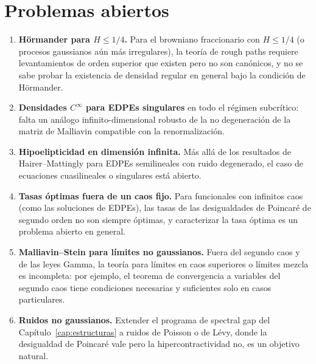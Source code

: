 \section{Problemas abiertos}
\begin{enumerate}
  \item \textbf{Hörmander para $H\le1/4$.} Para el browniano fraccionario con $H\le1/4$ (o procesos
  gaussianos aún más irregulares), la teoría de rough paths requiere levantamientos de orden
  superior que existen pero no son canónicos, y no se sabe probar la existencia de densidad
  regular en general bajo la condición de Hörmander.
  \item \textbf{Densidades $C^\infty$ para EDPEs singulares} en todo el régimen subcrítico: falta un
  análogo infinito-dimensional robusto de la no degeneración de la matriz de Malliavin
  compatible con la renormalización.
  \item \textbf{Hipoelipticidad en dimensión infinita.} Más allá de los resultados de Hairer--Mattingly
  para EDPEs semilineales con ruido degenerado, el caso de ecuaciones cuasilineales o
  singulares está abierto.
  \item \textbf{Tasas óptimas fuera de un caos fijo.} Para funcionales con infinitos caos (como las
  soluciones de EDPEs), las tasas de las desigualdades de Poincaré de segundo orden no
  son siempre óptimas, y caracterizar la tasa óptima es un problema abierto en general.
  \item \textbf{Malliavin--Stein para límites no gaussianos.} Fuera del segundo caos y de las
  leyes Gamma, la teoría para límites en caos superiores o límites mezcla es incompleta:
  por ejemplo, el teorema de convergencia a variables del segundo caos tiene condiciones
  necesarias y suficientes solo en casos particulares.
  \item \textbf{Ruidos no gaussianos.} Extender el programa de spectral gap del Capítulo~\ref{cap:estructuras} a ruidos
  de Poisson o de Lévy, donde la desigualdad de Poincaré vale pero la hipercontractividad
  no, es un objetivo natural.
\end{enumerate}

